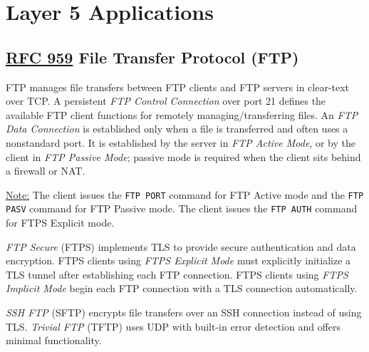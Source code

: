 \documentclass[12pt]{article}
\newif\ifcolor											%
\newcommand{\note}[1]{\ifcolor \colorbox{#1}{Note:}\else \underline{Note:}\fi}
\newcommand{\RFC}[1]{\href{https://datatracker.ietf.org/doc/html/rfc#1}{RFC #1}}
\begin{document}
\section{Layer 5 Applications \label{sec:L5}}

	\subsection[RFC 959 FTP]{\RFC{959} File Transfer Protocol (FTP) \label{subsec:FTP}}
	FTP manages file transfers between FTP clients and FTP servers in clear-text over TCP. A persistent \textit{FTP Control Connection} over port 21 defines the available FTP client functions for remotely managing/transferring files. An \textit{FTP Data Connection} is established only when a file is transferred and often uses a nonstandard port. It is established by the server in \textit{FTP Active Mode}, or by the client in \textit{FTP Passive Mode}; passive mode is required when the client sits behind a firewall or NAT.

	\note{Goldenrod} The client issues the \texttt{FTP PORT} command for FTP Active mode and the \texttt{FTP PASV} command for FTP Passive mode. The client issues the \texttt{FTP AUTH} command for FTPS Explicit mode.

	\textit{FTP Secure} (FTPS) implements TLS to provide secure authentication and data encryption. FTPS clients using \textit{FTPS Explicit Mode} must explicitly initialize a TLS tunnel after establishing each FTP connection. FTPS clients using \textit{FTPS Implicit Mode} begin each FTP connection with a TLS connection automatically.

	\textit{SSH FTP} (SFTP) encrypts file transfers over an SSH connection instead of using TLS. \textit{Trivial FTP} (TFTP) uses UDP with built-in error detection and offers minimal functionality.


\end{document}
